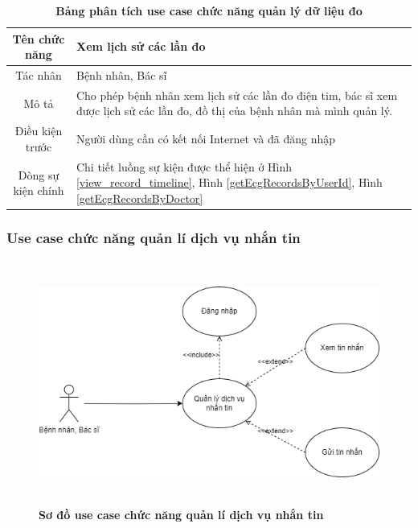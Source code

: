   \begin{table}[H]
    \caption{\bfseries \fontsize{12pt}{0pt}\selectfont Bảng phân tích use case chức năng quản lý dữ liệu đo}
    \centering
    \begin{tabularx}{0.9\textwidth}{|c|X|}
      \hline
      \textbf{Tên chức năng} & \textbf{Xem lịch sử các lần đo} \\
      \hline
      Tác nhân & Bệnh nhân, Bác sĩ \\
      \hline
      Mô tả & Cho phép bệnh nhân xem lịch sử các lần đo điện tim, bác sĩ xem được lịch sử các lần đo, đồ thị của bệnh nhân
      mà mình quản lý.\\
      \hline
      Điều kiện trước & Người dùng cần có kết nối Internet và đã đăng nhập \\
      \hline
      Dòng sự kiện chính & 
        Chi tiết luồng sự kiện được thể hiện ở Hình \ref{view_record_timeline}, Hình \ref{getEcgRecordsByUserId}, Hình \ref{getEcgRecordsByDoctor} 
        \\
      \hline
    \end{tabularx}
  \end{table}

\subsubsection{Use case chức năng quản lí dịch vụ nhắn tin}
  \begin{figure}[H]
    \centering
    \includegraphics[width=14.7cm,height=8cm]{Images/use_case/use_case_send_receive_message.png}
    \caption[Sơ đồ use case chức năng quản lí dịch vụ nhắn tin]{\bfseries \fontsize{12pt}{0pt}
    \selectfont Sơ đồ use case chức năng quản lí dịch vụ nhắn tin}
    \label{use_case_chat} %
  \end{figure}

